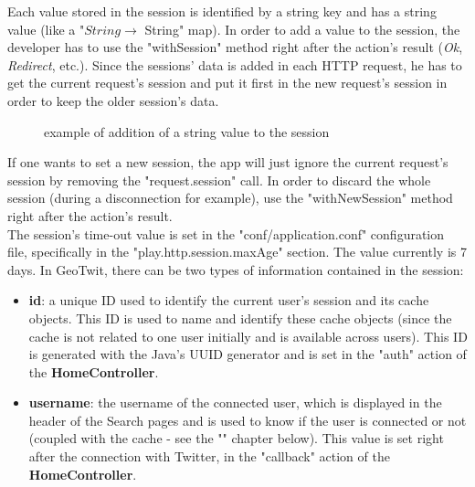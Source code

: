 \documentclass[a4paper,11pt]{report}
\begin{document}
Each value stored in the session is identified by a string key and has a string value (like a "$String\to$ String" map). In order to add a value to the session, the developer has to use the "withSession" method right after the action's result (\emph{Ok}, \emph{Redirect}, etc.). Since the sessions' data is added in each HTTP request, he has to get the current request's session and put it first in the new request's session in order to keep the older session's data.
\begin{figure}[H]
\vspace{-5pt}
\begin{center}
\vspace{-5pt}
\caption{example of addition of a string value to the session}
\end{center}
\end{figure}
\vspace{-10pt}

If one wants to set a new session, the app will just ignore the current request's session by removing the "request.session" call. In order to discard the whole session (during a disconnection for example), use the "withNewSession" method right after the action's result.\\

The session's time-out value is set in the "conf/application.conf" configuration file, specifically in the "play.http.session.maxAge" section. The value currently is 7 days.
\newpage
In GeoTwit, there can be two types of information contained in the session:
\begin{itemize}
	\item \textbf{id}: a unique ID used to identify the current user's session and its cache objects. This ID is used to name and identify these cache objects (since the cache is not related to one user initially and is available across users). This ID is generated with the Java's UUID generator and is set in the "auth" action of the \textbf{HomeController}.
	\item \textbf{username}: the username of the connected user, which is displayed in the header of the Search pages and is used to know if the user is connected or not (coupled with the cache - see the "" chapter below). This value is set right after the connection with Twitter, in the "callback" action of the \textbf{HomeController}.
\end{itemize}
\end{document}
